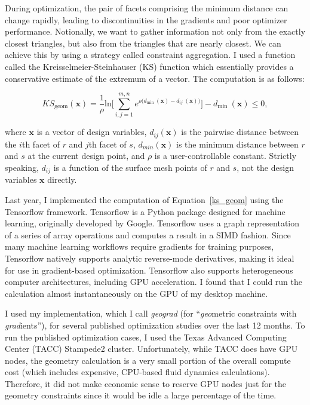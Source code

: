 \documentclass[11pt,letterpaper]{article}
\begin{document}
\qquad During optimization, the pair of facets comprising the minimum distance can change rapidly, leading to discontinuities in the gradients and poor optimizer performance.
Notionally, we want to gather information not only from the exactly closest triangles, but also from the triangles that are nearly closest.
We can achieve this by using a strategy called constraint aggregation.
I used a function called the Kreisselmeier-Steinhauser (KS) function which essentially provides a conservative estimate of the extremum of a vector.
The computation is as follows:

\begin{equation}
  \label{ks_geom}
  KS_\text{geom}(\textbf{x}) = \frac{1}{\rho} \textrm{ln} \Bigg[\sum_{i,j=1}^{m,n} e^{\rho\big(d_\text{min}\:(\textbf{x})-d_{ij}\:(\textbf{x})\big)}\Bigg] - d_\text{min}\:(\textbf{x}) \leq 0 ,
\end{equation}

where $\textbf{x}$ is a vector of design variables,
$d_{ij}(\textbf{x})$ is the pairwise distance between the $i$th facet of $r$ and $j$th facet of $s$,
$d_{min}(\textbf{x})$ is the minimum distance between $r$ and $s$ at the current design point, and
$\rho$ is a user-controllable constant.
Strictly speaking, $d_{ij}$ is a function of the surface mesh points of $r$ and $s$, not the design variables $\textbf{x}$ directly.

\qquad Last year, I implemented the computation of Equation~\ref{ks_geom} using the Tensorflow framework. %
Tensorflow is a Python package designed for machine learning, originally developed by Google.
Tensorflow uses a graph representation of a series of array operations and computes a result in a SIMD fashion.
Since many machine learning workflows require gradients for training purposes, Tensorflow natively supports analytic reverse-mode derivatives, making it ideal for use in gradient-based optimization.
Tensorflow also supports heterogeneous computer architectures, including GPU acceleration.
I found that I could run the calculation almost instantaneously on the GPU of my desktop machine.

\qquad I used my implementation, which I call \emph{geograd} (for ``\emph{geo}metric constraints with \emph{grad}ients''), for several published optimization studies over the last 12 months. %
To run the published optimization cases, I used the Texas Advanced Computing Center (TACC) Stampede2 cluster.
Unfortunately, while TACC does have GPU nodes, the geometry calculation is a very small portion of the overall compute cost (which includes expensive, CPU-based fluid dynamics calculations).
Therefore, it did not make economic sense to reserve GPU nodes just for the geometry constraints since it would be idle a large percentage of the time.
\end{document}
